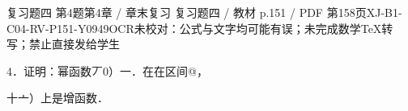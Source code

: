 \begin{bankitem}{复习题四 第4题}{第4章 / 章末复习 复习题四 / 教材 p.151 / PDF 第158页}{XJ-B1-C04-RV-P151-Y0949}{OCR未校对：公式与文字均可能有误；未完成数学TeX转写；禁止直接发给学生}
\begin{ocrdraft}
\par
4．证明：幂函数丆0）一．在在区间@，
\par
十亠）上是增函数．
\end{ocrdraft}
\end{bankitem}
